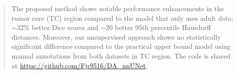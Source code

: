 \documentclass[runningheads]{llncs}
\begin{document}
\begin{abstract}
The proposed method shows notable performance enhancements in the tumor core (TC) region compared to the model that only uses adult data: $\sim$32\% better Dice scores and $\sim$20 better 95th percentile Hausdorff distances. 
Moreover, our unsupervised approach shows no statistically significant difference compared to the practical upper bound model using manual annotations from both datasets in TC region.
The code is shared at \url{https://github.com/Fjr9516/DA_nnUNet}.




\end{abstract}
\end{document}
